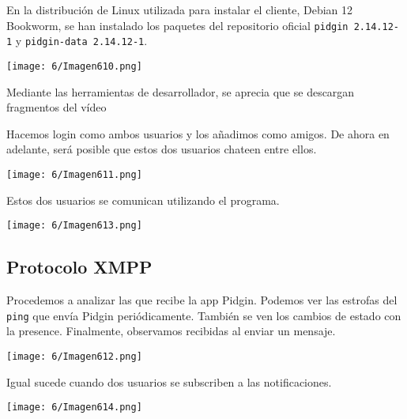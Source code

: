 En la distribución de Linux utilizada para instalar el cliente, Debian 12 Bookworm,
se han instalado los paquetes del repositorio oficial 
\lstinline{pidgin 2.14.12-1} y \lstinline{pidgin-data 2.14.12-1}.

\begin{minipage}{\linewidth}
	\centering
	\texttt{[image: 6/Imagen610.png]}
	\label{fig:6/1}
\end{minipage}

Mediante las herramientas de desarrollador, se aprecia que se descargan fragmentos del vídeo

Hacemos login como ambos usuarios y los añadimos como amigos.
De ahora en adelante, será posible que estos dos usuarios chateen entre ellos.

\begin{minipage}{\linewidth}
	\centering
	\texttt{[image: 6/Imagen611.png]}
	\label{fig:6/2}
\end{minipage}

Estos dos usuarios se comunican utilizando el programa.

\begin{minipage}{\linewidth}
	\centering
	\texttt{[image: 6/Imagen613.png]}
	\label{fig:6/3}
\end{minipage}

\subsection{Protocolo XMPP}

Procedemos a analizar las  que recibe la app Pidgin.
Podemos ver las estrofas del \lstinline{ping} que envía Pidgin periódicamente.
También se ven los cambios de estado con la  presence.
Finalmente, observamos  recibidas al enviar un mensaje.

\begin{minipage}{\linewidth}
	\centering
	\texttt{[image: 6/Imagen612.png]}
	\label{fig:6/4}
\end{minipage}

Igual sucede cuando dos usuarios se subscriben a las notificaciones.

\begin{minipage}{\linewidth}
	\centering
	\texttt{[image: 6/Imagen614.png]}
	\label{fig:6/5}
\end{minipage}

